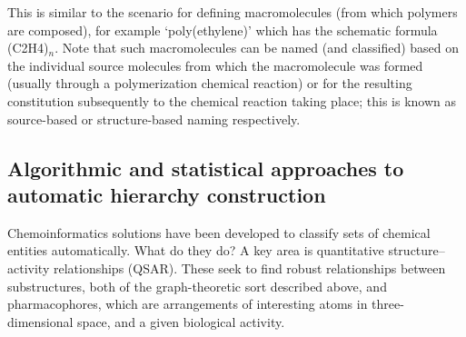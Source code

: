 \documentclass[10pt]{bmc_article}
\newenvironment{bmcformat}{\baselineskip20pt\sloppy\setboolean{publ}{false}}{\baselineskip20pt\sloppy}
\begin{document}
\begin{bmcformat}
This is similar to the scenario for defining macromolecules (from which polymers are composed), for example `poly(ethylene)' which has the schematic formula (C2H4)$_{n}$. Note that such macromolecules can be named (and classified) based on the individual source molecules from which the macromolecule was formed (usually through a polymerization chemical reaction) or for the resulting constitution subsequently to the chemical reaction taking place; this is known as source-based or structure-based naming respectively.  %





\subsection*{Algorithmic and statistical approaches to automatic hierarchy construction}
\label{sec:resultscheminf}


Chemoinformatics solutions have been developed to classify sets of chemical entities automatically.
What do they do?  A key area is quantitative structure--activity relationships (QSAR). These seek to find robust relationships between substructures, both of the graph-theoretic sort described above, and pharmacophores, which are arrangements of interesting atoms in three-dimensional space, and a given biological activity.


\end{bmcformat}
\end{document}
